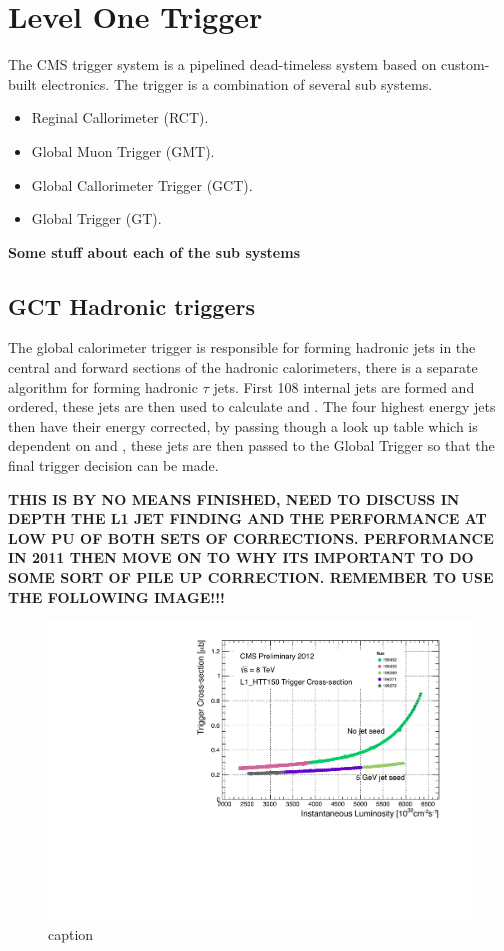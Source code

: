 \chapter{Level One Trigger} %
\label{cha:level_one_trigger}
The CMS \Lone trigger system\cite{l1} is a pipelined dead-timeless system based on custom-built electronics.
The \Lone trigger is a combination of several sub systems.
\begin{itemize}
  \item Reginal Callorimeter (RCT).
  \item Global Muon Trigger (GMT).
  \item Global Callorimeter Trigger (GCT).
  \item Global Trigger (GT).
\end{itemize}

\textbf{Some stuff about each of the sub systems}

\section{GCT Hadronic triggers} %
\label{sec:gct_hadronic_triggers}
The global calorimeter trigger is responsible for forming hadronic jets in the central and forward sections of the hadronic 
calorimeters, there is a separate algorithm for forming hadronic $\tau$ jets. First 108 internal jets are formed and ordered, these 
jets are then used to calculate \HT and \MHT. The four highest energy jets then have their energy corrected, by passing though a
look up table which is dependent on \ET and \mETA, these jets are then passed to the Global Trigger so that the final trigger
decision can be made.

\textbf{THIS IS BY NO MEANS FINISHED, NEED TO DISCUSS IN DEPTH THE L1 JET FINDING AND THE PERFORMANCE AT LOW PU OF
 BOTH SETS OF CORRECTIONS. PERFORMANCE IN 2011 THEN MOVE ON TO WHY ITS IMPORTANT TO DO SOME SORT OF PILE UP
  CORRECTION. REMEMBER TO USE THE FOLLOWING IMAGE!!!}

\begin{figure}[htbp]
  \centering
    \includegraphics[width=ht]{figures/LoneTrigger/HTT150_pileup.pdf}
  \caption{caption}
  \label{fig:figures_LoneTrigger_HTT150_pileup}
\end{figure}


